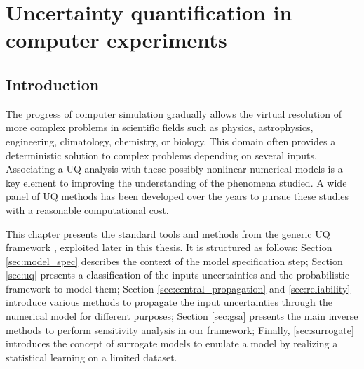 \chapter{Uncertainty quantification in computer experiments}
\hfill
\localtableofcontents
\newpage

\section{Introduction}\label{sec:intro}

The progress of computer simulation gradually allows the virtual resolution of more complex problems in scientific fields such as physics, astrophysics, engineering, climatology, chemistry, or biology.
This domain often provides a deterministic solution to complex problems depending on several inputs. 
Associating a UQ analysis with these possibly nonlinear numerical models is a key element to improving the understanding of the phenomena studied. 
A wide panel of UQ methods has been developed over the years to pursue these studies with a reasonable computational cost. 

This chapter presents the standard tools and methods from the generic UQ framework \citet{sullivan_2015}, exploited later in this thesis. 
It is structured as follows: Section \ref{sec:model_spec} describes the context of the model specification step; 
Section \ref{sec:uq} presents a classification of the inputs uncertainties and the probabilistic framework to model them; 
Section \ref{sec:central_propagation} and \ref{sec:reliability} introduce various methods to propagate the input uncertainties through the numerical model for different purposes;
Section \ref{sec:gsa} presents the main inverse methods to perform sensitivity analysis in our framework;
Finally, \ref{sec:surrogate} introduces the concept of surrogate models to emulate a model by realizing a statistical learning on a limited dataset.


